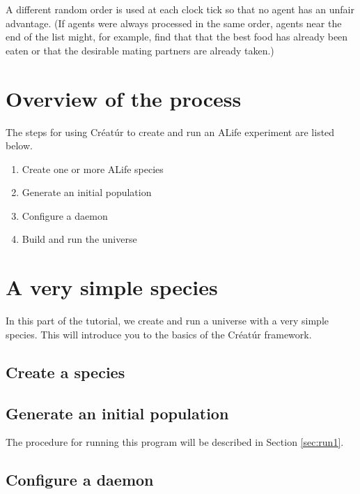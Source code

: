 \documentclass[a4paper,10pt]{report}
\begin{document}
A different random order is used at each clock tick
so that no agent has an unfair advantage.
(If agents were always processed in the same order, 
agents near the end of the list might, for example, find that that the 
best food has already been eaten or that the desirable mating
partners are already taken.)

\chapter{Overview of the process}

The steps for using Créatúr to create and run an ALife experiment
are listed below.

\begin{enumerate}
\item Create one or more ALife species
\item Generate an initial population
\item Configure a daemon
\item Build and run the universe
\end {enumerate}

\chapter{A very simple species}
\label{sec:rock}

In this part of the tutorial, we create and run a universe
with a very simple species.
This will introduce you to the basics of the Créatúr framework.

\section{Create a species}
\label{sec:species1}



\section{Generate an initial population}
\label{sec:pop1}



The procedure for running this program will be described in Section 
\ref{sec:run1}.

\section{Configure a daemon}
\label{sec:daemon1}
\end{document}
